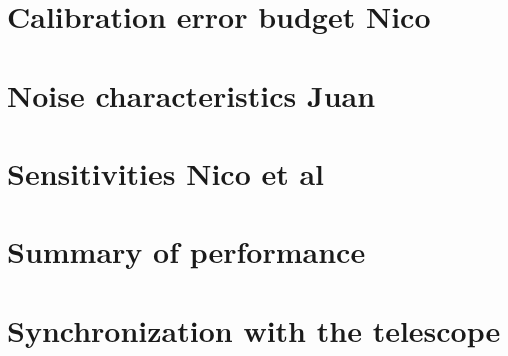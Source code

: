 \documentclass[a4paper, 11pt]{article} %
\begin{document}

\label{se:cal_JFL}




\clearpage
\section{Calibration error budget {\color{blue} Nico}}
\label{se:error}



\clearpage
\section{Noise characteristics {\color{blue} Juan}}
\label{se:noise}



\clearpage
\section{Sensitivities {\color{blue} Nico et al} }
\label{se:nefd}



\clearpage
\section{Summary of performance}
\label{se:summary}


\clearpage
\appendix

  \section{Synchronization with the telescope}
  \label{ap:synchro}
  
  
\end{document}
